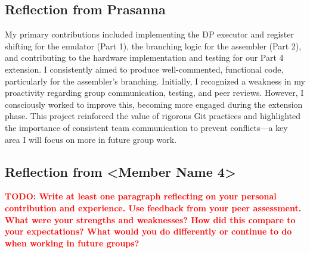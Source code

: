 \documentclass[11pt]{article}
\newcommand{\todo}[1]{\textcolor{red}{\textbf{TODO: #1}}}
\begin{document}
\subsection{Reflection from Prasanna}
My primary contributions included implementing the DP executor and register shifting for the emulator (Part 1), the branching logic for the assembler (Part 2), and contributing to the hardware implementation and testing for our Part 4 extension. I consistently aimed to produce well-commented, functional code, particularly for the assembler's branching. Initially, I recognized a weakness in my proactivity regarding group communication, testing, and peer reviews. However, I consciously worked to improve this, becoming more engaged during the extension phase. This project reinforced the value of rigorous Git practices and highlighted the importance of consistent team communication to prevent conflicts—a key area I will focus on more in future group work.

\subsection{Reflection from <Member Name 4>}
\todo{Write at least one paragraph reflecting on your personal contribution and experience. Use feedback from your peer assessment. What were your strengths and weaknesses? How did this compare to your expectations? What would you do differently or continue to do when working in future groups?}
\end{document}

